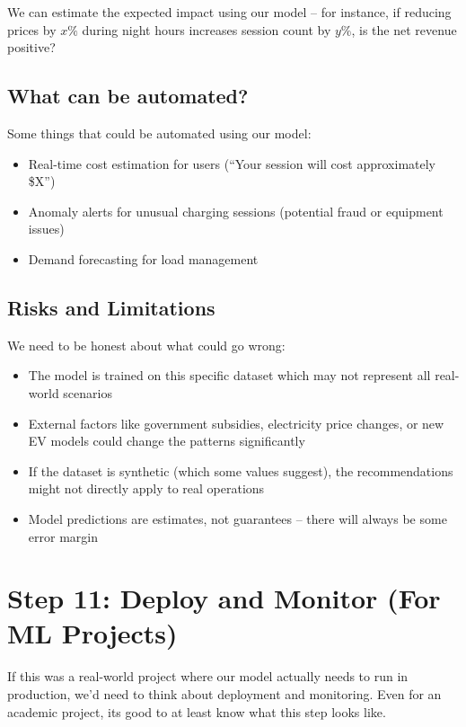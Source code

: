 \documentclass[12pt, a4paper]{article}
\begin{document}
We can estimate the expected impact using our model -- for instance, if reducing prices by $x\%$ during night hours increases session count by $y\%$, is the net revenue positive?

\subsection{What can be automated?}

Some things that could be automated using our model:
\begin{itemize}
    \item Real-time cost estimation for users (``Your session will cost approximately \$X'')
    \item Anomaly alerts for unusual charging sessions (potential fraud or equipment issues)
    \item Demand forecasting for load management
\end{itemize}

\subsection{Risks and Limitations}

We need to be honest about what could go wrong:
\begin{itemize}
    \item The model is trained on this specific dataset which may not represent all real-world scenarios
    \item External factors like government subsidies, electricity price changes, or new EV models could change the patterns significantly
    \item If the dataset is synthetic (which some values suggest), the recommendations might not directly apply to real operations
    \item Model predictions are estimates, not guarantees -- there will always be some error margin
\end{itemize}

\newpage

\section{Step 11: Deploy and Monitor (For ML Projects)}

If this was a real-world project where our model actually needs to run in production, we'd need to think about deployment and monitoring. Even for an academic project, its good to at least know what this step looks like.
\end{document}
